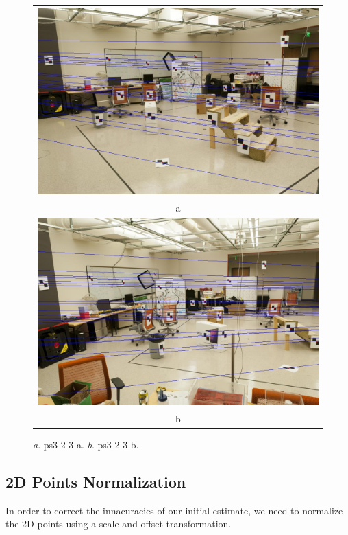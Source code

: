 \documentclass[a4paper,11pt]{article}
\begin{document}
 \begin{figure}[H]
\begin{center}
\begin{tabular}{c}
	\includegraphics[width=1\textwidth]{ps3-2-3-a.jpg}\\
	a\\
	\includegraphics[width=1\textwidth]{ps3-2-3-b.jpg}\\
	b
\end{tabular}
\end{center}
\caption{ 
\textit{a}. ps3-2-3-a.  \textit{b}. ps3-2-3-b. }
\label{ps3-2-3}
\end{figure}

\subsection{2D Points Normalization}


In order to correct the innacuracies of our initial estimate, we need to normalize the 2D points using a scale and offset transformation.
\end{document}
